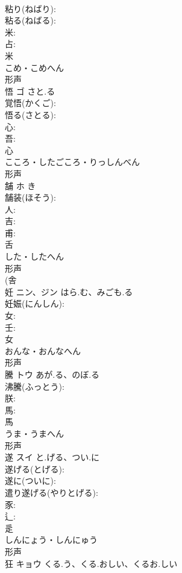 \documentclass[8pt]{extreport}
\begin{document}
\begin{CJK}{UTF8}{min}
\\	粘り(ねばり): 
\\	粘る(ねばる): 
\\	米: 
\\	占: 
\\	米	
\\	こめ・こめへん	
\\	形声 
\\	悟	ゴ	さと.る		
\\	覚悟(かくご): 
\\	悟る(さとる): 
\\	心: 
\\	吾: 
\\	心	
\\	こころ・したごころ・りっしんべん	
\\	形声 
\\	舗	ホ		き	
\\	舗装(ほそう): 
\\	人: 
\\	吉: 
\\	甫: 
\\	舌	
\\	した・したへん	
\\	形声 
\\	(舎 
\\	妊	ニン、ジン	はら.む、みごも.る		
\\	妊娠(にんしん): 
\\	女: 
\\	壬: 
\\	女	
\\	おんな・おんなへん	
\\	形声 
\\	騰	トウ	あが.る、のぼ.る		
\\	沸騰(ふっとう): 
\\	朕: 
\\	馬: 
\\	馬	
\\	うま・うまへん	
\\	形声 
\\	遂	スイ	と.げる、つい.に		
\\	遂げる(とげる): 
\\	遂に(ついに): 
\\	遣り遂げる(やりとげる): 
\\	豕: 
\\	辶: 
\\	辵	
\\	しんにょう・しんにゅう	
\\	形声 
\\	狂	キョウ	くる.う、くる.おしい、くるお.しい		

\end{CJK}
\end{document}
